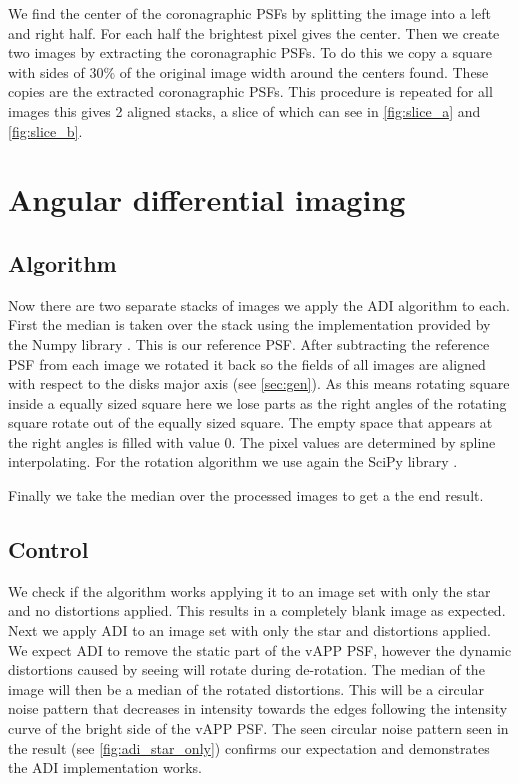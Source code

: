 We find the center of the coronagraphic \acp{PSF} by splitting the image into a left and right half. For each half the brightest pixel gives the center. Then we create two images by extracting the coronagraphic \acp{PSF}. To do this we copy a square with sides of $30\%$ of the original image width around the centers found. These copies are the extracted coronagraphic \acp{PSF}. This procedure is repeated for all images this gives 2 aligned stacks, a slice of which can see in \autoref{fig:slice_a} and \autoref{fig:slice_b}.

\section{Angular differential imaging}
\subsection{Algorithm}
Now there are two separate stacks of images we apply the \ac{ADI} algorithm \cite{Marois_2006} to each. First the median is taken over the stack using the implementation provided by the Numpy library \cite{numpy}. This is our reference \ac{PSF}. After subtracting the reference \ac{PSF} from each image we rotated it back so the fields of all images are aligned with respect to the disks major axis (see \autoref{sec:gen}). As this means rotating square inside a equally sized square here we lose parts as the right angles of the rotating square rotate out of the equally sized square. The empty space that appears at the right angles is filled with value $0$. The pixel values are determined by spline interpolating. For the rotation algorithm we use again the SciPy library \cite{scipy}.

Finally we take the median over the processed images to get a the end result.

\subsection{Control} %
We check if the algorithm works applying it to an image set with only the star and no distortions applied. This results in a completely blank image as expected. Next we apply \ac{ADI} to an image set with only the star and distortions applied. We expect \ac{ADI} to remove the static part of the \ac{vAPP} \ac{PSF}, however the dynamic distortions caused by seeing will rotate during de-rotation. The median of the image will then be a median of the rotated distortions. This will be a circular noise pattern that decreases in intensity towards the edges following the intensity curve of the bright side of the \ac{vAPP} \ac{PSF}. The seen circular noise pattern seen in the result (see \autoref{fig:adi_star_only}) confirms our expectation and demonstrates the \ac{ADI} implementation works.


